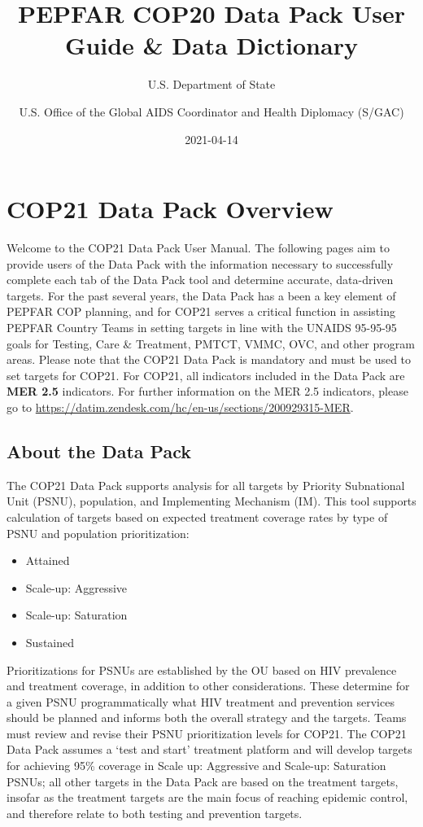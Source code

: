 \documentclass[
  openany]{book}
\title{PEPFAR COP20 Data Pack User Guide \& Data Dictionary}
\author{U.S. Department of State \and U.S. Office of the Global AIDS Coordinator and Health Diplomacy (S/GAC)}
\date{2021-04-14}
\begin{document}
\maketitle

\newpage

{
\hypersetup{linkcolor=}
\setcounter{tocdepth}{1}
\tableofcontents
}
\hypertarget{cop21-data-pack-overview}{%
\chapter{COP21 Data Pack Overview}\label{cop21-data-pack-overview}}

Welcome to the COP21 Data Pack User Manual. The following pages aim to
provide users of the Data Pack with the information necessary to
successfully complete each tab of the Data Pack tool and determine
accurate, data-driven targets. For the past several years, the Data Pack
has a been a key element of PEPFAR COP planning, and for COP21 serves a
critical function in assisting PEPFAR Country Teams in setting targets
in line with the UNAIDS 95-95-95 goals for Testing, Care \& Treatment,
PMTCT, VMMC, OVC, and other program areas. Please note that the COP21
Data Pack is mandatory and must be used to set targets for COP21. For
COP21, all indicators included in the Data Pack are \textbf{MER 2.5}
indicators. For further information on the MER 2.5 indicators, please go
to \url{https://datim.zendesk.com/hc/en-us/sections/200929315-MER}.

\hypertarget{about-the-data-pack}{%
\section{About the Data Pack}\label{about-the-data-pack}}

The COP21 Data Pack supports analysis for all targets by Priority
Subnational Unit (PSNU), population, and Implementing Mechanism (IM).
This tool supports calculation of targets based on expected treatment
coverage rates by type of PSNU and population prioritization:

\begin{itemize}
\item
  Attained
\item
  Scale-up: Aggressive
\item
  Scale-up: Saturation
\item
  Sustained
\end{itemize}

Prioritizations for PSNUs are established by the OU based on HIV
prevalence and treatment coverage, in addition to other considerations.
These determine for a given PSNU programmatically what HIV treatment and
prevention services should be planned and informs both the overall
strategy and the targets. Teams must review and revise their PSNU
prioritization levels for COP21. The COP21 Data Pack assumes a `test and
start' treatment platform and will develop targets for achieving 95\%
coverage in Scale up: Aggressive and Scale-up: Saturation PSNUs; all
other targets in the Data Pack are based on the treatment targets,
insofar as the treatment targets are the main focus of reaching epidemic
control, and therefore relate to both testing and prevention targets.
\end{document}
